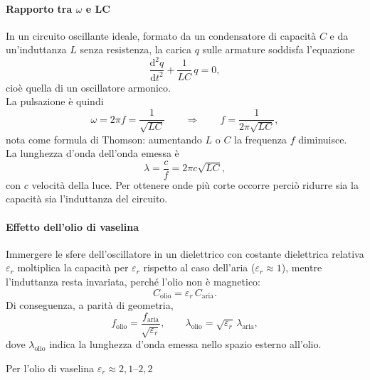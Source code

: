 \paragraph{Rapporto tra $\omega$ e LC}

\label{app:omega_LC}
In un circuito oscillante ideale, formato da un condensatore di capacità $C$ e da un'induttanza $L$ senza resistenza, la carica $q$ sulle armature soddisfa l'equazione
\begin{equation}
    \frac{\mathrm{d}^2 q}{\mathrm{d}t^2} + \frac{1}{LC}\,q = 0 ,
\end{equation}
cioè quella di un oscillatore armonico.\\
La pulsazione è quindi
\begin{equation}
    \omega = 2\pi f = \frac{1}{\sqrt{LC}}
    \qquad\Longrightarrow\qquad
    f = \frac{1}{2\pi\sqrt{LC}} ,
\end{equation}
nota come formula di Thomson: aumentando $L$ o $C$ la frequenza $f$ diminuisce.\\ 
La lunghezza d'onda dell'onda emessa è
\begin{equation}
    \lambda = \frac{c}{f} = 2\pi c\sqrt{LC} ,
\end{equation}
con $c$ velocità della luce. 
Per ottenere onde più corte occorre perciò ridurre sia la capacità sia l'induttanza del circuito.\\

\paragraph{Effetto dell'olio di vaselina}

Immergere le sfere dell'oscillatore in un dielettrico con costante dielettrica relativa $\varepsilon_r$ moltiplica la capacità per $\varepsilon_r$ rispetto al caso dell'aria ($\varepsilon_r \approx 1$), mentre l'induttanza resta invariata, perché l'olio non è magnetico:
\begin{equation}
    C_{\mathrm{olio}} = \varepsilon_r\, C_{\mathrm{aria}} .
\end{equation}
Di conseguenza, a parità di geometria,
\begin{equation}
    f_{\mathrm{olio}} = \frac{f_{\mathrm{aria}}}{\sqrt{\varepsilon_r}} ,
    \qquad
    \lambda_{\mathrm{olio}} = \sqrt{\varepsilon_r}\,\lambda_{\mathrm{aria}} ,
\end{equation}
dove $\lambda_{\mathrm{olio}}$ indica la lunghezza d'onda emessa nello spazio esterno all'olio. 

Per l'olio di vaselina $\varepsilon_r \approx 2{,}1$--$2{,}2$ 

